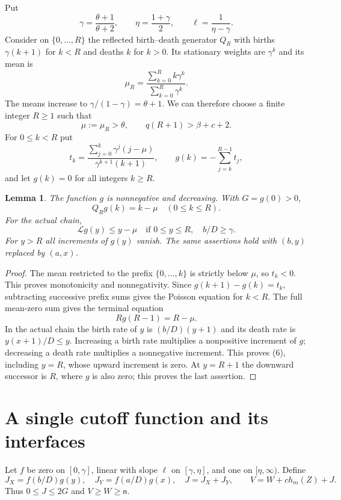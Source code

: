 \documentclass[11pt]{article}
\newtheorem{lemma}{Lemma}
\newcommand{\LL}{\mathcal L}
\begin{document}
Put
\[
 \gamma=\frac{\theta+1}{\theta+2},\qquad
 \eta=\frac{1+\gamma}{2},\qquad \ell=\frac1{\eta-\gamma}.
\]
Consider on $\{0,\ldots,R\}$ the reflected birth--death generator $Q_R$
with births $\gamma(k+1)$ for $k<R$ and deaths $k$ for $k>0$.
Its stationary weights are $\gamma^k$ and its mean is
\[
 \mu_R=\frac{\sum_{k=0}^R k\gamma^k}{\sum_{k=0}^R\gamma^k}.
\]
The means increase to $\gamma/(1-\gamma)=\theta+1$. We can therefore
choose a finite integer $R\ge1$ such that
\[
 \mu:=\mu_R>\theta,\qquad q(R+1)>\beta+c+2.                     \tag{5}
\]
For $0\le k<R$ put
\[
 t_k=\frac{\sum_{j=0}^k\gamma^j(j-\mu)}
                  {\gamma^{k+1}(k+1)},\qquad
 g(k)=-\sum_{j=k}^{R-1}t_j,
\]
and let $g(k)=0$ for all integers $k\ge R$.

\begin{lemma}\label{lem:poisson}
The function $g$ is nonnegative and decreasing. With $G=g(0)>0$,
\[
 Q_Rg(k)=k-\mu\quad(0\le k\le R).
\]
For the actual chain,
\[
 \LL g(y)\le y-\mu
 \quad\text{if }0\le y\le R,\quad b/D\ge\gamma.                 \tag{6}
\]
For $y>R$ all increments of $g(y)$ vanish. The same assertions hold
with $(b,y)$ replaced by $(a,x)$.
\end{lemma}
\begin{proof}
The mean restricted to the prefix $\{0,\ldots,k\}$ is strictly below
$\mu$, so $t_k<0$. This proves monotonicity and nonnegativity.
Since $g(k+1)-g(k)=t_k$, subtracting successive prefix sums gives the
Poisson equation for $k<R$. The full mean-zero sum gives the terminal
equation
\[
 Rg(R-1)=R-\mu.
\]
In the actual chain the birth rate of $y$ is $(b/D)(y+1)$ and its death
rate is $y(x+1)/D\le y$. Increasing a birth rate multiplies a nonpositive
increment of $g$; decreasing a death rate multiplies a nonnegative
increment. This proves (6), including $y=R$, whose upward increment
is zero. At $y=R+1$ the downward successor is $R$, where $g$ is also zero;
this proves the last assertion.
\end{proof}

\section{A single cutoff function and its interfaces}

Let $f$ be zero on $[0,\gamma]$, linear with slope $\ell$ on
$[\gamma,\eta]$, and one on $[\eta,\infty)$. Define
\[
 J_X=f(b/D)g(y),\quad J_Y=f(a/D)g(x),\quad J=J_X+J_Y,
 \qquad V=W+ch_m(Z)+J.                                       \tag{7}
\]
Thus $0\le J\le2G$ and $V\ge W\ge\mathsf n$.
\end{document}
